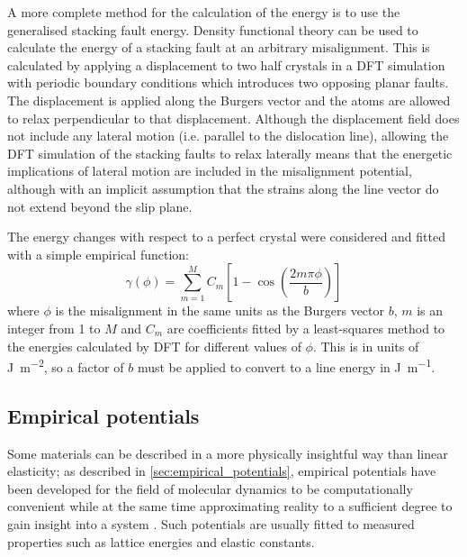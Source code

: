 A more complete method for the calculation of the energy is to use the generalised stacking fault energy. Density functional theory can be used to calculate the energy of a stacking fault at an arbitrary misalignment. This is calculated by applying a displacement to two half crystals in a DFT simulation with periodic boundary conditions which introduces two opposing planar faults. The displacement is applied along the Burgers vector and the atoms are allowed to relax perpendicular to that displacement. Although the displacement field does not include any lateral motion (i.e. parallel to the dislocation line), allowing the DFT simulation of the stacking faults to relax laterally means that the energetic implications of lateral motion are included in the misalignment potential, although with an implicit assumption that the strains along the line vector do not extend beyond the slip plane. 

The energy changes with respect to a perfect crystal were considered and fitted with a simple empirical function:
\begin{equation}
\gamma(\phi) = \sum^{M}_{m=1} C_m \left[ 1 - \cos \left( \frac{2m\pi \phi}{b} \right) \right]
\end{equation}
where $\phi$ is the misalignment in the same units as the Burgers vector $b$, $m$ is an integer from \num{1} to $M$ and $C_m$ are coefficients fitted by a least-squares method to the energies calculated by DFT for different values of $\phi$. This is in units of \si{\joule\per\square\meter}, so a factor of $b$ must be applied to convert to a line energy in \si{\joule\per\meter}.












\subsection{Empirical potentials}

Some materials can be described in a more physically insightful way than linear elasticity; as described in \autoref{sec:empirical_potentials}, empirical potentials have been developed for the field of molecular dynamics to be computationally convenient while at the same time approximating reality to a sufficient degree to gain insight into a system \cite{martinez2013}. Such potentials are usually fitted to measured properties such as lattice energies and elastic constants.

